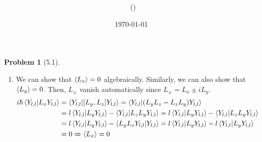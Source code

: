 \documentclass[twoside,11pt]{article}
\title{{\lms \Code \ \Ass}}
\author{\lms \name \ (\href{mailto:\mail}{\mail})}
\date{\sffamily \today}
\makeatletter
\theoremstyle{definition}
\newtheorem{problem}{Problem}
\theoremstyle{remark}
\newtheorem*{remark}{Remark}
\renewcommand{\maketitle}{\bgroup\setlength{\parindent}{0pt}
\begin{flushleft}
  \textbf{\Large\@title}

  \@author
\end{flushleft}\egroup
}
\makeatother
\begin{document}
\maketitle
\thispagestyle{title}


\begin{problem}[5.1]\
\begin{enumerate}[label=(\alph*)]
    \item We can show that $\braket{L_x}=0$ algebraically.
    Similarly, we can also show that $\braket{L_y}=0$.
    Then, $L_{\pm}$ vanish automatically since $L_{\pm} = L_x \pm i L_y$.
    \begin{align*}
        i\hbar\braket{Y_{l,l}|L_xY_{l,l}}
        &= \braket{Y_{l,l}|[L_y, L_z]Y_{l,l}}
        = \braket{Y_{l,l}|(L_yL_z-L_zL_y)Y_{l,l}} \\
        &= l\braket{Y_{l,l}|L_y Y_{l,l}} - \braket{Y_{l,l}|L_zL_yY_{l,l}}
        = l\braket{Y_{l,l}|L_y Y_{l,l}} - \braket{Y_{l,l}|L_zL_yY_{l,l}}\\
        &= l\braket{Y_{l,l}|L_yY_{l,l}} - \braket{L_yL_zY_{l,l}|Y_{l,l}}
        = l\braket{Y_{l,l}|L_yY_{l,l}} - l\braket{Y_{l,l}|L_yY_{l,l}}\\
        &= 0\Rightarrow \braket{L_x}=0
    \end{align*}


\end{enumerate}
\end{problem}
\end{document}
